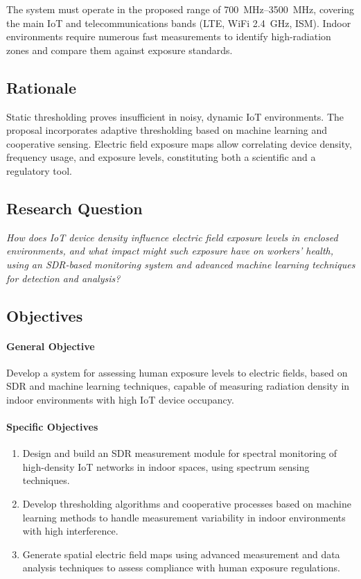 \documentclass[12pt,a4paper]{article}
\begin{document}
The system must operate in the proposed range of \qtyrange{700}{3500}{\MHz}, covering the main IoT and telecommunications bands (LTE, WiFi 2.4~GHz, ISM). Indoor environments require numerous fast measurements to identify high-radiation zones and compare them against exposure standards.

\subsection{Rationale}

Static thresholding proves insufficient in noisy, dynamic IoT environments. The proposal incorporates adaptive thresholding based on machine learning and cooperative sensing. Electric field exposure maps allow correlating device density, frequency usage, and exposure levels, constituting both a scientific and a regulatory tool.

\subsection{Research Question}

\noindent
\textit{How does IoT device density influence electric field exposure levels in enclosed environments, and what impact might such exposure have on workers’ health, using an SDR-based monitoring system and advanced machine learning techniques for detection and analysis?}

\subsection{Objectives}

\paragraph{General Objective}
Develop a system for assessing human exposure levels to electric fields, based on SDR and machine learning techniques, capable of measuring radiation density in indoor environments with high IoT device occupancy.

\paragraph{Specific Objectives}
\begin{enumerate}[label=SO\arabic*:,leftmargin=2.5em]
  \item Design and build an SDR measurement module for spectral monitoring of high-density IoT networks in indoor spaces, using spectrum sensing techniques.
  \item Develop thresholding algorithms and cooperative processes based on machine learning methods to handle measurement variability in indoor environments with high interference.
  \item Generate spatial electric field maps using advanced measurement and data analysis techniques to assess compliance with human exposure regulations.
\end{enumerate}
\end{document}
